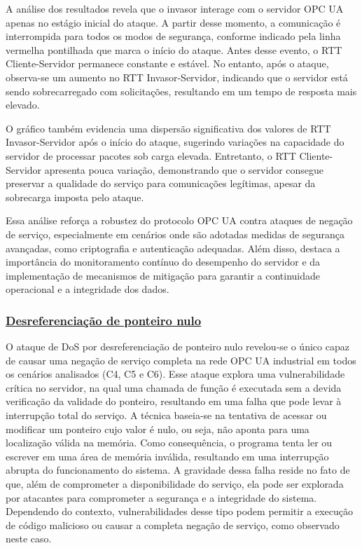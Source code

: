             A análise dos resultados revela que o invasor interage com o servidor OPC UA apenas no estágio inicial do ataque. A partir desse momento, a comunicação é interrompida para todos os modos de segurança, conforme indicado pela linha vermelha pontilhada que marca o início do ataque. Antes desse evento, o RTT Cliente-Servidor permanece constante e estável. No entanto, após o ataque, observa-se um aumento no RTT Invasor-Servidor, indicando que o servidor está sendo sobrecarregado com solicitações, resultando em um tempo de resposta mais elevado.

            O gráfico também evidencia uma dispersão significativa dos valores de RTT Invasor-Servidor após o início do ataque, sugerindo variações na capacidade do servidor de processar pacotes sob carga elevada. Entretanto, o RTT Cliente-Servidor apresenta pouca variação, demonstrando que o servidor consegue preservar a qualidade do serviço para comunicações legítimas, apesar da sobrecarga imposta pelo ataque.

            Essa análise reforça a robustez do protocolo OPC UA contra ataques de negação de serviço, especialmente em cenários onde são adotadas medidas de segurança avançadas, como criptografia e autenticação adequadas. Além disso, destaca a importância do monitoramento contínuo do desempenho do servidor e da implementação de mecanismos de mitigação para garantir a continuidade operacional e a integridade dos dados.

        \subsubsection*{\underline{Desreferenciação de ponteiro nulo}}

            O ataque de DoS por desreferenciação de ponteiro nulo revelou-se o único capaz de causar uma negação de serviço completa na rede OPC UA industrial em todos os cenários analisados (C4, C5 e C6). Esse ataque explora uma vulnerabilidade crítica no servidor, na qual uma chamada de função é executada sem a devida verificação da validade do ponteiro, resultando em uma falha que pode levar à interrupção total do serviço. A técnica baseia-se na tentativa de acessar ou modificar um ponteiro cujo valor é nulo, ou seja, não aponta para uma localização válida na memória. Como consequência, o programa tenta ler ou escrever em uma área de memória inválida, resultando em uma interrupção abrupta do funcionamento do sistema. A gravidade dessa falha reside no fato de que, além de comprometer a disponibilidade do serviço, ela pode ser explorada por atacantes para comprometer a segurança e a integridade do sistema. Dependendo do contexto, vulnerabilidades desse tipo podem permitir a execução de código malicioso ou causar a completa negação de serviço, como observado neste caso.

